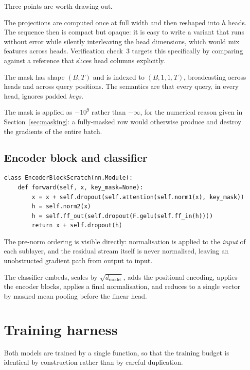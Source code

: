 Three points are worth drawing out.

 The projections are computed once at full width and then reshaped
into $h$ heads. The sequence  then  is compact but opaque: it is easy to
write a variant that runs without error while silently interleaving the head dimensions, which
would mix features across heads. Verification check~3 targets this specifically by comparing
against a reference that slices head columns explicitly.

 The mask has shape $(B, T)$ and is indexed to $(B, 1, 1, T)$,
broadcasting across heads and across query positions. The semantics are that every query, in every
head, ignores padded \emph{keys}.

 The mask is applied as $-10^{9}$ rather than $-\infty$, for
the numerical reason given in Section~\ref{sec:masking}: a fully-masked row would otherwise
produce  and destroy the gradients of the entire batch.

\subsection{Encoder block and classifier}

{\small
\begin{verbatim}
class EncoderBlockScratch(nn.Module):
    def forward(self, x, key_mask=None):
        x = x + self.dropout(self.attention(self.norm1(x), key_mask))
        h = self.norm2(x)
        h = self.ff_out(self.dropout(F.gelu(self.ff_in(h))))
        return x + self.dropout(h)
\end{verbatim}}

The pre-norm ordering is visible directly: normalisation is applied to the \emph{input} of each
sublayer, and the residual stream itself is never normalised, leaving an unobstructed gradient
path from output to input.

The classifier embeds, scales by $\sqrt{d_{\text{model}}}$, adds the positional encoding, applies
the encoder blocks, applies a final normalisation, and reduces to a single vector by masked mean
pooling before the linear head.

\section{Training harness}

Both models are trained by a single function, so that the training budget is identical by
construction rather than by careful duplication.


